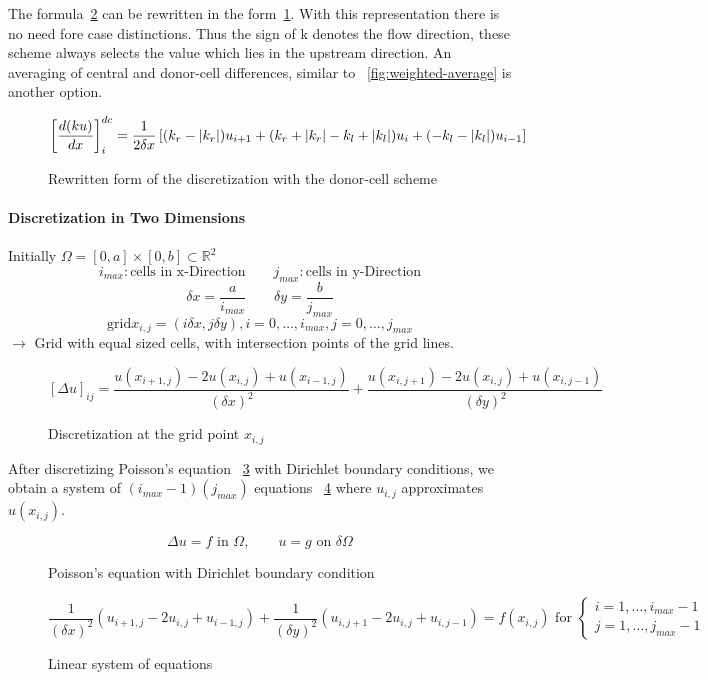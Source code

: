 The formula~\ref{fig:dcs-method} can be rewritten in the form~\ref{fig:dcs-method-rewritten}. With this representation there is no need fore case distinctions. Thus the sign of k denotes the flow direction, these scheme always selects the value which lies in the upstream direction. An averaging of central and donor-cell differences, similar to ~\ref{fig:weighted-average} is another option.
\begin{figure}[H]
	\centering
	\[ \left[\frac{d(k u)}{d x}\right]^{dc}_i = \frac{1}{2 \delta x} \left[ (k_r - \lvert k_r\rvert) u_{i+1} + (k_r + \lvert k_r\rvert-k_l +\lvert k_l\rvert) u_i  + (-k_l -\lvert k_l\rvert)u_{i-1} \right] \]
	\renewcommand{\thefigure}{3.12}
	\caption{Rewritten form of the discretization with the donor-cell scheme}
	\label{fig:dcs-method-rewritten}
\end{figure}

\paragraph{Discretization in Two Dimensions}
Initially $\Omega = [0,a] \times [0,b] \subset \mathds{R}^2$
\[i_{max} : \text{cells in x-Direction} \qquad j_{max} : \text{cells in y-Direction}\]
\[\delta x  = \frac{a}{i_{max}} \qquad \delta y = \frac{b}{j_{max}}\]
\[\text{grid} x_{i,j} = (i \delta x, j \delta y), i = 0, \dots, i_{max}, j = 0, \dots, j_{max} \]
$\rightarrow$ Grid with equal sized cells, with intersection points of the grid lines.

\begin{figure}[H]
	\centering
	\[ [\Delta u]_{ij} = \frac{u(x_{i+1,j}) - 2u(x_{i,j}) + u(x_{i-1,j})}{(\delta x)^2} + \frac{u(x_{i,j+1}) - 2u(x_{i,j}) + u(x_{i,j-1})}{(\delta y)^2}\]
	\renewcommand{\thefigure}{3.13}
	\caption{Discretization at the grid point $x_{i,j}$}
	\label{fig:dcs-method}
\end{figure}

After discretizing Poisson's equation ~\ref{fig:pe-dirich} with Dirichlet boundary conditions, we obtain  a system of $(i_{max}-1)(j_{max})$ equations ~\ref{fig:sys-of-eq} where $u_{i,j}$ approximates $u(x_{i,j})$.
\begin{figure}[H]
	\centering
	\[ \Delta u = f \text{ in } \Omega, \qquad u = g \text{ on } \delta\Omega\]
	\renewcommand{\thefigure}{3.14}
	\caption{Poisson's equation with Dirichlet boundary condition}
	\label{fig:pe-dirich}
\end{figure}

\begin{figure}[H]
	\centering
	\[ \frac{1}{(\delta x)^2} (u_{i+1,j} - 2u_{i,j} + u_{i-1,j}) + \frac{1}{(\delta y)^2} (u_{i,j+1} - 2u_{i,j} + u_{i,j-1}) = f(x_{i,j}) \text{ for } \begin{cases}
	i = 1, \dots, i_{max}-1 \\
	j = 1, \dots, j_{max}-1
\end{cases} \]
	\renewcommand{\thefigure}{3.15}
	\caption{Linear system of equations}
	\label{fig:sys-of-eq}
\end{figure}



